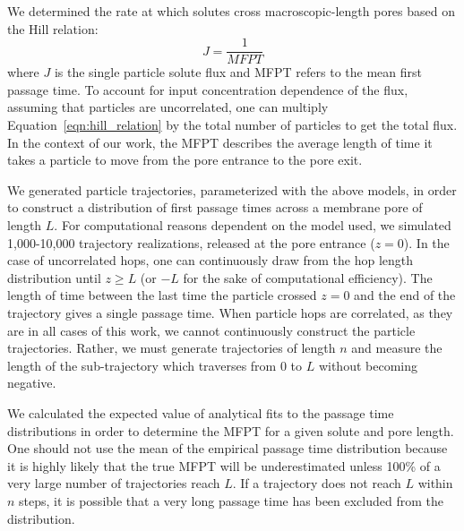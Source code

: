 \documentclass{article}
\begin{document}
  We determined the rate at which solutes cross macroscopic-length pores based on the
  Hill relation:~\cite{hill_free_1989}
  \begin{equation}
  J = \frac{1}{MFPT}
  \label{eqn:hill_relation}
  \end{equation}
  where $J$ is the single particle solute flux and MFPT refers to the mean first passage
  time. To account for input concentration dependence of the flux, assuming that particles
  are uncorrelated, one can multiply Equation~\ref{eqn:hill_relation} by the total number
  of particles to get the total flux. In the context of our work, the MFPT describes the
  average length of time it takes a particle to move from the pore entrance to the pore exit. 
  
  We generated particle trajectories, parameterized with the above models, in order
  to construct a distribution of first passage times across a membrane pore of length $L$.
  For computational reasons dependent on the model used, we simulated 1,000-10,000 trajectory
  realizations, released at the pore entrance ($z=0$). In the case of 
  uncorrelated hops, one can continuously draw from the hop length distribution until 
  $z \geq L$ (or $-L$ for the sake of computational efficiency). The length of time 
  between the last time the particle crossed $z=0$ and the end of the trajectory gives a 
  single passage time. When particle hops are correlated, as they are in all cases of
  this work, we cannot continuously construct the particle trajectories. Rather, we must
  generate trajectories of length $n$ and measure the length of the sub-trajectory 
  which traverses from $0$ to $L$ without becoming negative.
  
  We calculated the expected value of analytical fits to the passage time distributions
  in order to determine the MFPT for a given solute and pore length. One should not 
  use the mean of the empirical passage time distribution because it is highly likely
  that the true MFPT will be underestimated unless 100\% of a very large number of 
  trajectories reach $L$. If a trajectory does not reach $L$ within $n$ steps, it is
  possible that a very long passage time has been excluded from the distribution.
  
\end{document}
